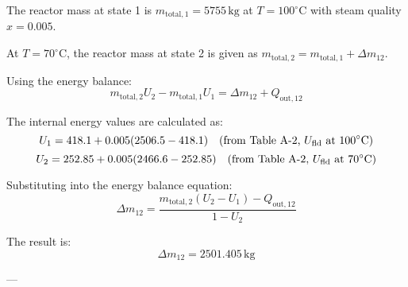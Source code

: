 The reactor mass at state 1 is \( m_{\text{total},1} = 5755 \, \text{kg} \) at \( T = 100^\circ\text{C} \) with steam quality \( x = 0.005 \).  

At \( T = 70^\circ\text{C} \), the reactor mass at state 2 is given as \( m_{\text{total},2} = m_{\text{total},1} + \Delta m_{12} \).  

Using the energy balance:  
\[
m_{\text{total},2} U_2 - m_{\text{total},1} U_1 = \Delta m_{12} + Q_{\text{out},12}
\]  

The internal energy values are calculated as:  
\[
U_1 = 418.1 + 0.005 (2506.5 - 418.1) \quad \text{(from Table A-2, \( U_{\text{fld}} \) at \( 100^\circ\text{C} \))}
\]  
\[
U_2 = 252.85 + 0.005 (2466.6 - 252.85) \quad \text{(from Table A-2, \( U_{\text{fld}} \) at \( 70^\circ\text{C} \))}
\]  

Substituting into the energy balance equation:  
\[
\Delta m_{12} = \frac{m_{\text{total},2}(U_2 - U_1) - Q_{\text{out},12}}{1 - U_2}
\]  

The result is:  
\[
\Delta m_{12} = 2501.405 \, \text{kg}
\]  

---
